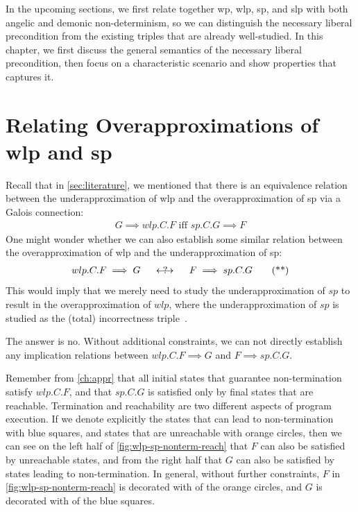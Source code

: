 In the upcoming sections, we first relate together wp, wlp, sp, and slp with both angelic and demonic non-determinism, so we can distinguish the necessary liberal precondition from the existing triples that are already well-studied. 
In this chapter, we first discuss the general semantics of the necessary liberal precondition, then focus on a characteristic scenario and show properties that captures it. 

\section{Relating Overapproximations of wlp and sp}\label{sec:negative}
Recall that in \autoref{sec:literature}, we mentioned that there is an equivalence relation between the underapproximation of wlp and the overapproximation of sp via a Galois connection: 
\begin{align}
	G\implies wlp.C.F\text{\ \ \ \ iff\ \ \ \   } sp.C.G\implies F \tag{*}
\end{align}
One might wonder whether we can also establish some similar relation between the overapproximation of wlp and the underapproximation of sp:  
\begin{align}
	wlp.C.F \implies G\ \ \ \  \rlap{\(\quad?\)}\longleftrightarrow \ \ \ \ F\implies sp.C.G \tag{**}
\end{align}
This would imply that we merely need to study the underapproximation of $sp$ to result in the overapproximation of $wlp$, where the underapproximation of $sp$ is studied as the (total) incorrectness triple~\cite{ohearn2020IncorrectnessLogic}. 

The answer is no. 
Without additional constraints, we can not directly establish any implication relations between $wlp.C.F\implies G$ and $F\implies sp.C.G$. 

Remember from \autoref{ch:appr} that all initial states that guarantee non-termination satisfy $wlp.C.F$, and that $sp.C.G$ is satisfied only by final states that are reachable. 
Termination and reachability are two different aspects of program execution. 
If we denote explicitly the states that can lead to non-termination with blue squares, and states that are unreachable with orange circles, then we can see on the left half of \autoref{fig:wlp-sp-nonterm-reach} that $F$ can also be satisfied by unreachable states, and from the right half that $G$ can also be satisfied by states leading to non-termination.
In general, without further constraints, $F$ in \autoref{fig:wlp-sp-nonterm-reach} is decorated with  of the orange circles, and $G$ is decorated with  of the blue squares. 


